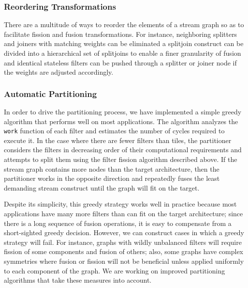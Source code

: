 \subsubsection{Reordering Transformations}

There are a multitude of ways to reorder the elements of a stream
graph so as to facilitate fission and fusion transformations.  For
instance, neighboring splitters and joiners with matching weights can
be eliminated a splitjoin construct can be divided into a hierarchical
set of splitjoins to enable a finer granularity of fusion and
identical stateless filters can be pushed through a splitter or joiner
node if the weights are adjusted accordingly.

\subsubsection{Automatic Partitioning}

In order to drive the partitioning process, we have implemented a
simple greedy algorithm that performs well on most applications.  The
algorithm analyzes the {\tt work} function of each filter and
estimates the number of cycles required to execute it.  
In the case where there are fewer filters than tiles, the partitioner
considers the filters in decreasing order of their computational
requirements and attempts to split them using the filter fission
algorithm described above.  
If the stream graph contains more nodes than the target architecture,
then the partitioner works in the opposite direction and repeatedly
fuses the least demanding stream construct until the graph will fit on
the target.  

Despite its simplicity, this greedy strategy works well in practice
because most applications have many more filters than can fit on the
target architecture; since there is a long sequence of fusion
operations, it is easy to compensate from a short-sighted greedy
decision.  However, we can construct cases in which a greedy strategy
will fail.  For instance, graphs with wildly unbalanced filters will
require fission of some components and fusion of others; also, some
graphs have complex symmetries where fusion or fission will not be
beneficial unless applied uniformly to each component of the graph.
We are working on improved partitioning algorithms that take these
measures into account.


